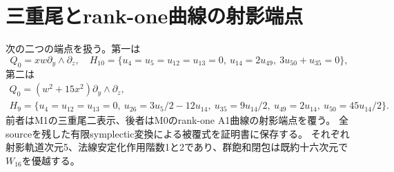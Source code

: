 \documentclass[11pt,a4paper]{ltjsarticle}
\theoremstyle{remark}
\begin{document}
\section{三重尾とrank-one曲線の射影端点}
次の二つの端点を扱う。第一は
\[
 Q_0=xw\partial_y\wedge\partial_z,\quad
 H_{10}=\{u_4=u_5=u_{12}=u_{13}=0,\ u_{14}=2u_{49},\ 3u_{50}+u_{35}=0\},
\]
第二は
\begin{gather*}
 Q_0=(w^2+15x^2)\partial_y\wedge\partial_z,\\
 H_9=\{u_4=u_{12}=u_{13}=0,\ u_{26}=3u_5/2-12u_{14},\
 u_{35}=9u_{14}/2,\ u_{49}=2u_{14},\ u_{50}=45u_{14}/2\}.
\end{gather*}
前者はM1の三重尾二表示、後者はM0のrank-one A1曲線の射影端点を覆う。
全sourceを残した有限symplectic変換による被覆式を証明書に保存する。
それぞれ射影軌道次元5、法線安定化作用階数1と2であり、群飽和閉包は既約十六次元で$W_{16}$を優越する。
\end{document}
